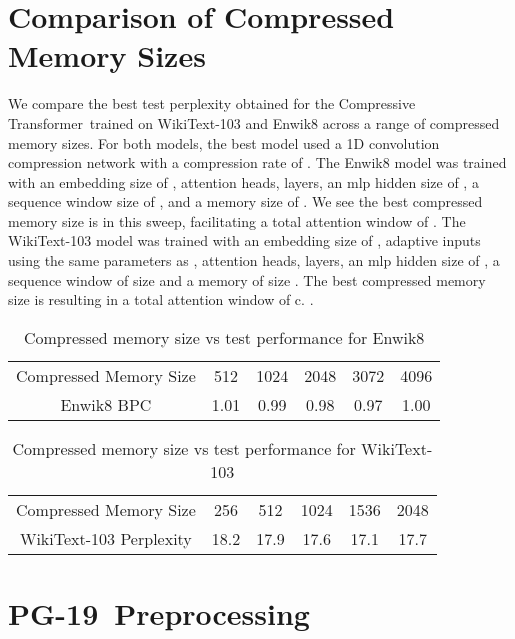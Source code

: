 \documentclass{article} \usepackage{iclr2020_conference,times}
\newcommand{\model}{Compressive Transformer}
\newcommand{\dataset}{PG-19}
\begin{document}
\section{Comparison of Compressed Memory Sizes}
\label{app:cm_ablation}
We compare the best test perplexity obtained for the \model~trained on WikiText-103 and Enwik8 across a range of compressed memory sizes. For both models, the best model used a 1D convolution compression network with a compression rate of . The Enwik8 model was trained with an embedding size of ,  attention heads,  layers, an mlp hidden size of , a sequence window size of , and a memory size of . We see the best compressed memory size is  in this sweep, facilitating a total attention window of . The WikiText-103 model was trained with an embedding size of , adaptive inputs using the same parameters as \citep{sukhbaatar2019adaptive},  attention heads,  layers, an mlp hidden size of , a sequence window of size  and a memory of size . The best compressed memory size is  resulting in a total attention window of c. .  

\begin{table}[h!]
    \centering
    \begin{tabular}{c|c c c c c}
    \toprule
         Compressed Memory Size        & 512 & 1024 & 2048 & 3072 & 4096 \\
         Enwik8 BPC                    & 1.01	& 0.99 & 0.98 & 0.97 & 1.00 \\
    \bottomrule
    \end{tabular}
    \caption{Compressed memory size vs test performance for Enwik8}
    \label{tab:memory_sizes_enwik8}
\end{table}

\begin{table}[h!]
    \centering
    \begin{tabular}{c|c c c c c}
    \toprule
         Compressed Memory Size     & 256 & 512 & 1024 & 1536 & 2048 \\
         WikiText-103 Perplexity    & 18.2 & 17.9 & 17.6 & 17.1 & 17.7 \\
    \bottomrule
    \end{tabular}
    \caption{Compressed memory size vs test performance for WikiText-103}
    \label{tab:memory_sizes_wikitext}
\end{table}

\section{\dataset~Preprocessing}
\end{document}
